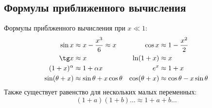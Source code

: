 \subsection{Формулы приближенного вычисления}
Формулы приблженного вычисления при $x \ll 1$:
\begin{align*}
\sin x &\approx x - \frac{x^3}{6} \approx x & \cos x &\approx 1 - \frac{x^2}{2} \\
\tg x &\approx x & \ln(1+x) &\approx x \\
(1 + x)^\alpha &\approx 1 + \alpha x & e^x &\approx 1 + x \\
\sin (\theta + x) &\approx \sin \theta + x \cos \theta & \cos(\theta + x) &\approx \cos \theta - x \sin \theta
\end{align*}
Также существует равенство для нескольких малых переменных:
\begin{equation*}
(1 + a)(1 + b) \ldots \approx 1 + a + b \ldots
\end{equation*}